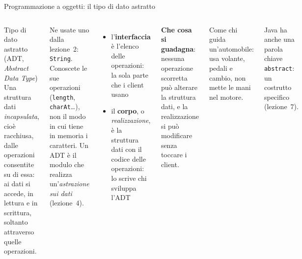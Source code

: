 \documentclass[10pt,aspectratio=169]{beamer}
\begin{document}
\begin{frame}[fragile]{Programmazione a oggetti: il tipo di dato astratto}
\begin{columns}[T]
\begin{block}{Tipo di dato astratto (ADT, \emph{Abstract Data Type})}
\small Una struttura dati \emph{incapsulata}, cioè racchiusa, dalle operazioni consentite su di essa: ai dati si accede, in lettura e in scrittura, soltanto attraverso quelle operazioni.
\end{block}

\small
Ne usate uno dalla lezione~2: \texttt{String}. Conoscete le sue operazioni (\texttt{length}, \texttt{charAt}\ldots), non il modo in cui tiene in memoria i caratteri. Un ADT è il modulo che realizza un'\emph{astrazione sui dati} (lezione~4).
\begin{itemize}\itemsep=2pt
    \item l'\textbf{interfaccia} è l'elenco delle operazioni: la sola parte che i client usano
    \item il \textbf{corpo}, o \emph{realizzazione}, è la struttura dati con il codice delle operazioni: lo scrive chi sviluppa l'ADT
\end{itemize}

\textbf{Che cosa si guadagna}: nessuna operazione scorretta può alterare la struttura dati, e la realizzazione si può modificare senza toccare i client.

\footnotesize
Come chi guida un'automobile: usa volante, pedali e cambio, non mette le mani nel motore.

\vspace{0.1cm}
Java ha anche una parola chiave \texttt{abstract}: un costrutto specifico (lezione~7).
\end{columns}
\end{frame}
\end{document}
